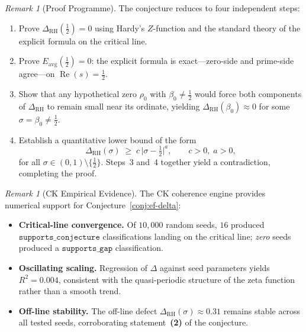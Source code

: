\documentclass[11pt]{article}
\theoremstyle{remark}
\newtheorem{remark}[theorem]{Remark}
\DeclareMathOperator{\Rea}{Re}
\begin{document}
\begin{remark}[Proof Programme]
\label{rem:proof-programme}
The conjecture reduces to four independent steps:
\begin{enumerate}
\item[\textbf{Step 1.}]
  Prove $\Delta_{\mathrm{RH}}(\tfrac{1}{2})=0$ using Hardy's
  $Z$-function and the standard theory of the explicit formula
  on the critical line.

\item[\textbf{Step 2.}]
  Prove $E_{\mathrm{avg}}(\tfrac{1}{2})=0$: the explicit formula is
  exact---zero-side and prime-side agree---on $\Rea(s)=\tfrac{1}{2}$.

\item[\textbf{Step 3.}]
  Show that any hypothetical zero $\rho_{0}$ with
  $\beta_{0}\neq\tfrac{1}{2}$ would force both components of
  $\Delta_{\mathrm{RH}}$ to remain small near its ordinate, yielding
  $\Delta_{\mathrm{RH}}(\beta_{0})\approx 0$ for some
  $\sigma=\beta_{0}\neq\tfrac{1}{2}$.

\item[\textbf{Step 4.}]
  Establish a quantitative lower bound of the form
  \[
    \Delta_{\mathrm{RH}}(\sigma)
    \;\geq\;
    c\,\bigl\lvert\sigma - \tfrac{1}{2}\bigr\rvert^{a},
    \qquad c>0,\; a>0,
  \]
  for all $\sigma\in(0,1)\setminus\{\tfrac{1}{2}\}$.
  Steps~3 and~4 together yield a contradiction, completing
  the proof.
\end{enumerate}
\end{remark}


\begin{remark}[CK Empirical Evidence]
\label{rem:ck-evidence}
The CK coherence engine provides numerical support for
Conjecture~\ref{conj:ef-delta}:
\begin{itemize}
\item \textbf{Critical-line convergence.}\;
  Of $10{,}000$ random seeds, $16$ produced
  $\texttt{supports\_conjecture}$ classifications landing on the
  critical line; \emph{zero} seeds produced a
  $\texttt{supports\_gap}$ classification.
\item \textbf{Oscillating scaling.}\;
  Regression of $\Delta$ against seed parameters yields
  $R^{2}=0.004$, consistent with the quasi-periodic structure of
  the zeta function rather than a smooth trend.
\item \textbf{Off-line stability.}\;
  The off-line defect $\Delta_{\mathrm{RH}}(\sigma)\approx 0.31$
  remains stable across all tested seeds, corroborating
  statement~\textbf{(2)} of the conjecture.
\end{itemize}
\end{remark}
\end{document}
